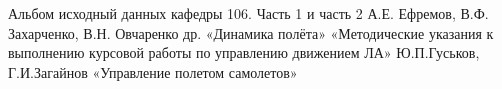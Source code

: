 \newpage
\begin{thebibliography}{10}
    Альбом исходный данных кафедры 106. Часть 1 и часть 2   
    А.Е. Ефремов, В.Ф. Захарченко, В.Н. Овчаренко др. «Динамика полёта»
    «Методические указания к выполнению курсовой работы по управлению движением ЛА»
    Ю.П.Гуськов, Г.И.Загайнов «Управление полетом самолетов»
\end{thebibliography}